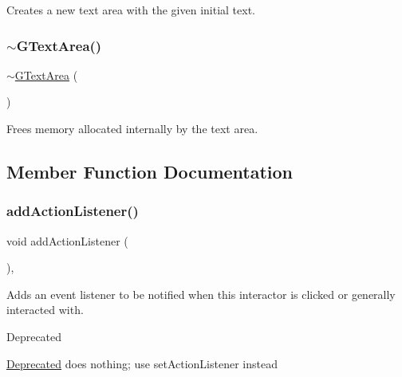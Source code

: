 Creates a new text area with the given initial text. 

\mbox{\label{classGTextArea_a260e7e5c7191b6200b0a2d2cfc0caf17}} 
\subsubsection{\texorpdfstring{$\sim$\+G\+Text\+Area()}{~GTextArea()}}
{\footnotesize\ttfamily $\sim$\mbox{\hyperlink{classGTextArea}{G\+Text\+Area}} (\begin{DoxyParamCaption}{ }\end{DoxyParamCaption})\hspace{0.3cm}{\ttfamily [virtual]}}



Frees memory allocated internally by the text area. 



\subsection{Member Function Documentation}
\mbox{\label{classGInteractor_a02f20ea6edfa0671f31c4c648a253833}} 
\subsubsection{\texorpdfstring{add\+Action\+Listener()}{addActionListener()}}
{\footnotesize\ttfamily void add\+Action\+Listener (\begin{DoxyParamCaption}{ }\end{DoxyParamCaption})\hspace{0.3cm}{\ttfamily [virtual]}, {\ttfamily [inherited]}}



Adds an event listener to be notified when this interactor is clicked or generally interacted with. 

\begin{DoxyRefDesc}{Deprecated}
\item[\mbox{\hyperlink{deprecated__deprecated000006}{Deprecated}}]does nothing; use set\+Action\+Listener instead \end{DoxyRefDesc}
\mbox{\label{classGTextArea_ac7d00bfb7f87912fd664b97f29cc71e9}} 
